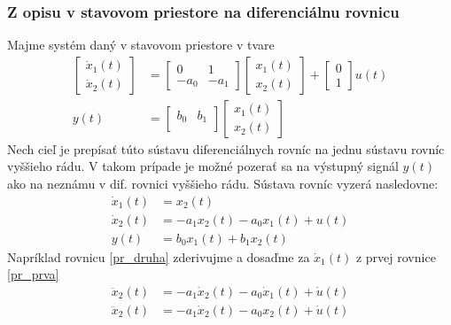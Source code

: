\documentclass[a4paper, 10pt, ]{article}
\begin{document}
\subsubsection{Z opisu v stavovom priestore na diferenciálnu rovnicu}

Majme systém daný v stavovom priestore v tvare
\begin{align}
	\begin{bmatrix}
    	  \dot x_1(t) \\
		  \dot x_2(t)
 	\end{bmatrix}
	&=
	\begin{bmatrix}
    	0 & 1 \\
    	- a_0 & - a_1
  	\end{bmatrix}
    \begin{bmatrix}
    	  x_1(t) \\
		  x_2(t)
 	\end{bmatrix}
    +
    \begin{bmatrix}
    	  0 \\
		  1
 	\end{bmatrix}
    u(t)
    \\
    y(t)
    &=
    \begin{bmatrix}
        b_0 & b_1 \\
    \end{bmatrix}
    \begin{bmatrix}
          x_1(t) \\
          x_2(t)
    \end{bmatrix}
\end{align}
Nech cieľ je prepísať túto sústavu diferenciálnych rovníc na jednu sústavu rovníc vyššieho rádu. V takom prípade je možné pozerať sa na výstupný signál $y(t)$ ako na neznámu v dif. rovnici vyššieho rádu. Sústava rovníc vyzerá nasledovne:
\begin{align}
    \dot x_1(t) &= x_2(t) \label{pr_prva}\\
    \dot x_2(t) &= - a_1 x_2(t) - a_0 x_1(t) + u(t) \label{pr_druha}\\
    y(t) &= b_0 x_1(t) + b_1 x_2(t) \label{pr_tretia}
\end{align}
Napríklad rovnicu \eqref{pr_druha} zderivujme a dosaďme za $\dot x_1(t)$ z prvej rovnice \eqref{pr_prva}
\begin{align}
    \ddot x_2(t) &= - a_1 \dot x_2(t) - a_0 \dot x_1(t) + \dot u(t) \\
    \ddot x_2(t) &= - a_1 \dot x_2(t) - a_0 x_2(t) + \dot u(t) \label{92}
\end{align}
\end{document}
